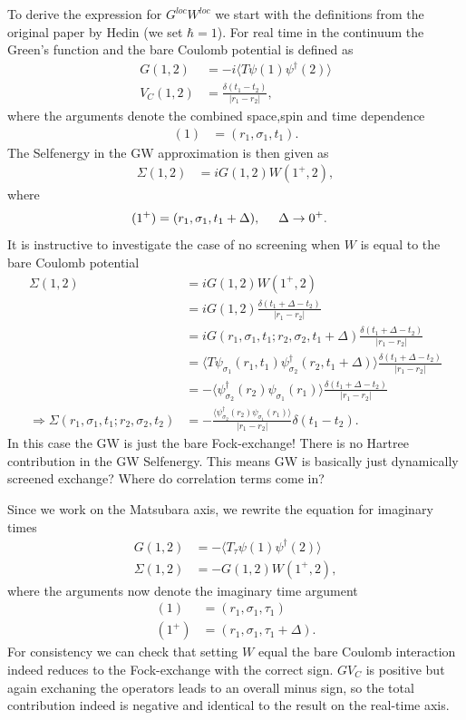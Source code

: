 \documentclass[12pt,a4paper]{scrartcl}
\numberwithin{equation}{section}
\begin{document}
To derive the expression for $G^{loc}W^{loc}$ we start with the definitions
from the original paper by Hedin (we set $\hbar=1$).
For real time in the continuum the Green's function and
the bare Coulomb potential is defined as
\begin{align}
G(1,2) &= -i \langle T \psi(1)\psi^{\dagger}(2) \rangle \\
V_C(1,2) &= \frac{\delta(t_1-t_2)}{|r_1-r_2|},
\end{align}
where the arguments denote the combined space,spin and time dependence
\begin{align}
 (1) &= (r_1,\sigma_1,t_1).
\end{align}
The Selfenergy in the GW approximation is then given as
\begin{align}
 \Sigma(1,2) &= i G(1,2)W(1^+,2),
\end{align}
where
\begin{align}
 (1^+) &= (r_1,\sigma_1,t_1+\Delta), \hspace{0.5cm} \Delta\rightarrow 0^+.
\end{align}
It is instructive to investigate the case of no screening when 
$W$ is equal to the bare Coulomb potential
\begin{align}
 \Sigma(1,2) &= i G(1,2)W(1^+,2)                      \\
 &= i G(1,2) \frac{\delta(t_1+\Delta-t_2)}{|r_1-r_2|}  \\
 &= i G(r_1,\sigma_1,t_1;r_2,\sigma_2,t_1+\Delta) \frac{\delta(t_1+\Delta-t_2)}{|r_1-r_2|}  \\
 &= \langle T \psi_{\sigma_1}(r_1,t_1)\psi^{\dagger}_{\sigma_2}(r_2,t_1+\Delta) \rangle \frac{\delta(t_1+\Delta-t_2)}{|r_1-r_2|}  \\
 &= -\langle \psi^{\dagger}_{\sigma_2}(r_2)\psi_{\sigma_1}(r_1) \rangle \frac{\delta(t_1+\Delta-t_2)}{|r_1-r_2|}  \\
\Rightarrow \Sigma(r_1,\sigma_1,t_1;r_2,\sigma_2,t_2)
&= -\frac{\langle \psi^{\dagger}_{\sigma_2}(r_2)\psi_{\sigma_1}(r_1) \rangle }{|r_1-r_2|}\delta(t_1-t_2) .
\end{align}
In this case the GW is just the bare Fock-exchange!
There is no Hartree contribution in the GW Selfenergy.
This means GW is basically just dynamically screened
exchange? Where do correlation terms come in?

Since we work on the Matsubara axis, we rewrite 
the equation for imaginary times
\begin{align}
G(1,2) &= - \langle T_{\tau} \psi(1)\psi^{\dagger}(2) \rangle \\
\Sigma(1,2) &= - G(1,2)W(1^+,2),
\end{align}
where the arguments now denote the imaginary time argument
\begin{align}
 (1) &= (r_1,\sigma_1,\tau_1) \\
 (1^+) &= (r_1,\sigma_1,\tau_1+\Delta).
\end{align}
For consistency we can check that setting $W$ equal
the bare Coulomb interaction indeed reduces to the
Fock-exchange with the correct sign. $GV_C$ is positive
but again exchaning the operators leads to an overall minus sign,
so the total contribution indeed is negative and identical
to the result on the real-time axis.
\end{document}
